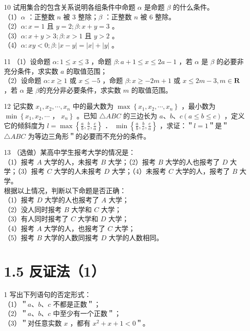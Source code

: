 \documentclass[10pt]{article}
\begin{document}
10 试用集合的包含关系说明各组条件中命题 \(\alpha\) 是命题 \(\beta\) 的什么条件。\\
（1）\(\alpha\) ：正整数 \(n\) 被 3 整除；\(\beta\) ：正整数 \(n\) 被 6 整除。\\
（2）\(\alpha: x=1\) 且 \(y=2 ; \beta: x+y=3\) 。\\
（3）\(\alpha: x+y>3 ; \beta: x>1\) 且 \(y>2\) 。\\
（4）\(\alpha: x y<0 ; \beta:|x-y|=|x|+|y|\) 。

11 （1）设命题 \(\alpha: 1 \leqslant x \leqslant 3\) ，命题 \(\beta: a+1 \leqslant x \leqslant 2 a-1\) ，若 \(\alpha\) 是 \(\beta\) 的必要非充分条件，求实数 \(a\) 的取值范围；\\
（2）设命题 \(\alpha: x \geqslant 1\) 或 \(x \leqslant-5\) ，命题 \(\beta: x \geqslant-2 m+1\) 或 \(x \leqslant 2 m-3, m \in \mathbf{R}\) ，若 \(\alpha\) 是 \(\beta\)的充分非必要条件，求实数 \(m\) 的取值范围。

12 记实数 \(x_{1}, x_{2}, \cdots, x_{n}\) 中的最大数为 \(\max \left\{x_{1}, x_{2}, \cdots, x_{n}\right\}\) ，最小数为 \(\min \left\{x_{1}, x_{2}, \cdots\right.\) ， \(\left.x_{n}\right\}\) 。已知 \(\triangle A B C\) 的三边长为 \(a 、 b 、 c(a \leqslant b \leqslant c)\) ，定义它的倾斜度为 \(l=\max \left\{\frac{a}{b}, \frac{b}{c}, \frac{c}{a}\right\}\) ． \(\min \left\{\frac{a}{b}, \frac{b}{c}, \frac{c}{a}\right\}\) ，求证：＂\(l=1\)＂是＂\(\triangle A B C\) 为等边三角形＂的必要而不充分的条件。

13 （选做）某高中学生报考大学的情况是：\\
（1）报考 \(A\) 大学的人，未报考 \(B\) 大学；（2）报考 \(B\) 大学的人也报考了 \(D\) 大学；（3）报考 \(C\) 大学的人未报考 \(D\) 大学；（4）未报考 \(C\) 大学的人，报考了 \(B\) 大学。\\
根据以上情况，判断以下命题是否正确：\\
（1）报考 \(D\) 大学的人也报考了 \(A\) 大学；\\
（2）没人同时报考 \(B\) 大学和 \(C\) 大学；\\
（3）有人同时报考了 \(C\) 大学和 \(D\) 大学；\\
（4）报考 \(A\) 大学的人，也报考了 \(C\) 大学；\\
（5）报考 \(B\) 大学的人数同报考 \(D\) 大学的人数相同。

\section*{1.5 反证法（1）}
1 写出下列语句的否定形式：\\
（1）＂\(a 、 b 、 c\) 不都是正数＂；\\
（2）＂\(a 、 b 、 c\) 中至少有一个正数＂；\\
（3）＂对任意实数 \(x\) ，都有 \(x^{2}+x+1<0\)＂。
\end{document}

